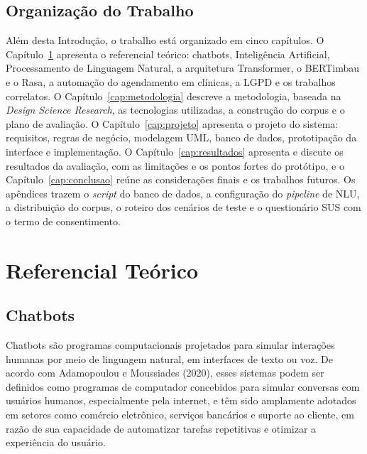 \documentclass[12pt,a4paper]{extarticle}
\begin{document}
\subsection{Organização do Trabalho}

Além desta Introdução, o trabalho está organizado em cinco capítulos. O Capítulo~\ref{cap:referencial} apresenta o referencial teórico: chatbots, Inteligência Artificial, Processamento de Linguagem Natural, a arquitetura Transformer, o BERTimbau e o Rasa, a automação do agendamento em clínicas, a LGPD e os trabalhos correlatos. O Capítulo~\ref{cap:metodologia} descreve a metodologia, baseada na \textit{Design Science Research}, as tecnologias utilizadas, a construção do corpus e o plano de avaliação. O Capítulo~\ref{cap:projeto} apresenta o projeto do sistema: requisitos, regras de negócio, modelagem UML, banco de dados, prototipação da interface e implementação. O Capítulo~\ref{cap:resultados} apresenta e discute os resultados da avaliação, com as limitações e os pontos fortes do protótipo, e o Capítulo~\ref{cap:conclusao} reúne as considerações finais e os trabalhos futuros. Os apêndices trazem o \textit{script} do banco de dados, a configuração do \textit{pipeline} de NLU, a distribuição do corpus, o roteiro dos cenários de teste e o questionário SUS com o termo de consentimento.

\newpage
\section{Referencial Teórico}
\label{cap:referencial}

\subsection{Chatbots}

Chatbots são programas computacionais projetados para simular interações humanas por meio de linguagem natural, em interfaces de texto ou voz. De acordo com Adamopoulou e Moussiades (2020), esses sistemas podem ser definidos como programas de computador concebidos para simular conversas com usuários humanos, especialmente pela internet, e têm sido amplamente adotados em setores como comércio eletrônico, serviços bancários e suporte ao cliente, em razão de sua capacidade de automatizar tarefas repetitivas e otimizar a experiência do usuário.
\end{document}
